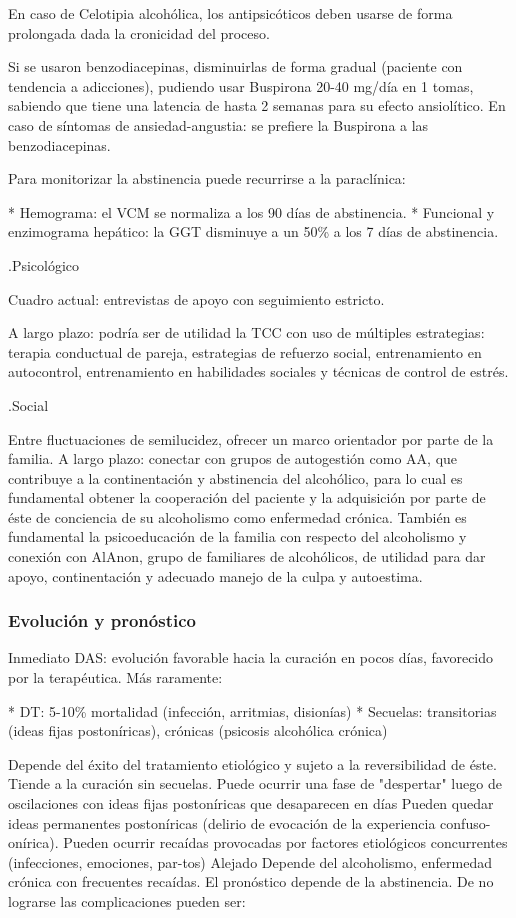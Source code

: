 \documentclass[encares.tex]{subfiles}
\begin{document}
En caso de Celotipia alcohólica, los antipsicóticos deben usarse de forma prolongada dada la cronicidad del proceso.

Si se usaron benzodiacepinas, disminuirlas de forma gradual (paciente con tendencia a adicciones), pudiendo usar Buspirona 20-40 mg/día en 1 tomas, sabiendo que tiene una latencia de hasta 2 semanas para su efecto ansiolítico. En caso de síntomas de ansiedad-angustia: se prefiere la Buspirona a las benzodiacepinas.

Para monitorizar la abstinencia puede recurrirse a la paraclínica:

* Hemograma: el VCM se normaliza a los 90 días de abstinencia.
* Funcional y enzimograma hepático: la GGT disminuye a un 50\% a los 7 días de abstinencia.

.Psicológico

Cuadro actual: entrevistas de apoyo con seguimiento estricto.

A largo plazo: podría ser de utilidad la TCC con uso de múltiples estrategias: terapia conductual de pareja, estrategias de refuerzo social, entrenamiento en autocontrol, entrenamiento en habilidades sociales y técnicas de control de estrés.

.Social

Entre fluctuaciones de semilucidez, ofrecer un marco orientador por parte de la familia. A largo plazo: conectar con grupos de autogestión como AA, que contribuye a la continentación y abstinencia del alcohólico, para lo cual es fundamental obtener la cooperación del paciente y la adquisición por parte de éste de conciencia de su alcoholismo como enfermedad crónica. También es fundamental la psicoeducación de la familia con respecto del alcoholismo y conexión con AlAnon, grupo de familiares de alcohólicos, de utilidad para dar apoyo, continentación y adecuado manejo de la culpa y autoestima.

\subsubsection*{Evolución y pronóstico}

Inmediato DAS: evolución favorable hacia la curación en pocos días, favorecido por la terapéutica. Más raramente:

* DT: 5-10\% mortalidad (infección, arritmias, disionías)
* Secuelas: transitorias (ideas fijas postoníricas), crónicas (psicosis alcohólica crónica)

Depende del éxito del tratamiento etiológico y sujeto a la reversibilidad de éste. Tiende a la curación sin secuelas. Puede ocurrir una fase de "despertar" luego de oscilaciones con ideas fijas postoníricas que desaparecen en días Pueden quedar ideas permanentes postoníricas (delirio de evocación de la experiencia confuso-onírica). Pueden ocurrir recaídas provocadas por factores etiológicos concurrentes (infecciones, emociones, par-tos) Alejado Depende del alcoholismo, enfermedad crónica con frecuentes recaídas. El pronóstico depende de la abstinencia. De no lograrse las complicaciones pueden ser:
\end{document}
